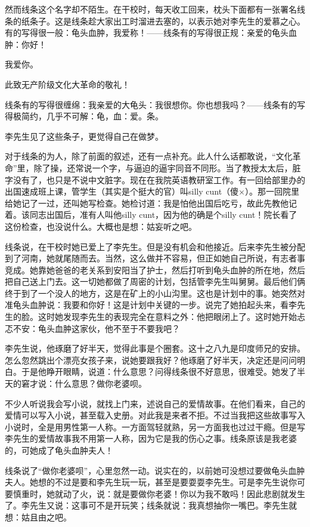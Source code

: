 然而线条这个名字却不陌生。在干校时，每天收工回来，枕头下面都有一张署名线条的纸条子。这是线条趁大家出工时溜进去塞的，以表示她对李先生的爱慕之心。有的写得很一般：龟头血肿，我爱称！——线条有的写得很正规：亲爱的龟头血肿：你好！ 


我爱你。 

此致无产阶级文化大革命的敬礼！ 

线条有的写得很缠绵：我亲爱的大龟头：我很想你。你也想我吗？——线条有的写得极简约，几乎不可解：龟，血：爱。条。 

李先生见了这些条子，更觉得自己在做梦。 

对于线条的为人，除了前面的叙述，还有一点补充。此人什么话都敢说，“文化革命”里，除了操，还常说一个字，与逼迫的逼宇同音不同形。当了教授太太后，脏字没有了，也只是不说中文脏字。现在在我院英语教研室工作。有一回给部里办的出国速成班上课，管学生（其实是个挺大的官）叫silly cunt（傻×）。那一回院里给她记了一过，还叫她写检查。她检讨道：我是怕他出国后吃亏，故此先教他记着。该同志出国后，准有人叫他silly cunt，因为他的确是个silly cunt！院长看了这份检查，也没说什么。大概也是想：姑妄听之吧。 

线条说，在干校时她已爱上了李先生。但是没有机会和他接近。后来李先生被分配到了河南，她就尾随而去。当然，这么做并不容易，但正如她自己所说，有志者事竞成。她靠她爸爸的老关系到安阳当了护士，然后打听到龟头血肿的所在地，然后把自己送上门去。这一切她都做了周密的计划，包括管李先生叫舅舅。最后他们俩终于到了一个没人的地方，这是在矿上的小山沟里。这也是计划中的事。她突然对准龟头血肿说：我要和你好！这是计划中关键的一步。说完了她拍起头来，看李先生的脸。这时她发现李先生的表现完全在意料之外：他把眼闭上了。这时她开始忐忑不安：龟头血肿这家伙，他不至于不要我吧？ 

李先生说，他琢磨了好半天，觉得此事是个圈套。这十之八九是印度师兄的安排。怎么忽然跳出个漂亮女孩子来，说她要跟我好？他琢磨了好半天，决定还是问问明白。于是他睁开眼睛，说道：什么意思？问得线条很不好意思，很难受。她发了半天的窘才说：什么意思？做你老婆呗。 

不少人听说我会写小说，就找上门来，述说自己的爱情故事。在他们看来，自己的爱情可以写入小说，甚至载入史册。对此我是来者不拒。不过当我把这些故事写入小说时，全是用男性第一人称。一方面驾轻就熟，另一方面我也过过干瘾。但是写李先生的爱情故事我不用第一人称，因为它是我的伤心之事。线条原该是我老婆的，可她成了龟头血肿夫人！ 

线条说了“做你老婆呗”，心里忽然一动。说实在的，以前她可没想过要做龟头血肿夫人。她想的不过是要和李先生玩一玩，甚至是要耍耍李先生。可是李先生说你可要慎重时，她就动了火，说：就是要做你老婆！你以为我不敢吗！因此悲剧就发生了。李先生又说：这事可不是开玩笑；线条就说：我真想抽你一嘴巴。李先生就想：姑且由之吧。 

